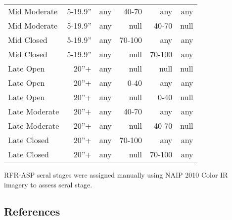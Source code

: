 \begin{table}[hbp]
\begin{tabular}{@{}lrrrrr@{}}
Mid Moderate     & 5-19.9''        & any & 40-70  & any    & any  \\
Mid Moderate     & 5-19.9''        & any & null   & 40-70  & null \\
Mid Closed       & 5-19.9''        & any & 70-100 & any    & any  \\
Mid Closed       & 5-19.9''        & any & null   & 70-100 & any  \\
Late Open        & 20''+           & any & null   & null   & null \\
Late Open        & 20''+           & any & 0-40   & any    & any  \\
Late Open        & 20''+           & any & null   & 0-40   & null \\
Late Moderate    & 20''+           & any & 40-70  & any    & any  \\
Late Moderate    & 20''+           & any & null   & 40-70  & null \\
Late Closed      & 20''+           & any & 70-100 & any    & any  \\
Late Closed      & 20''+           & any & null   & 70-100 & any  \\ \bottomrule
\end{tabular}
\end{table}

RFR-ASP seral stages were assigned manually using NAIP 2010 Color IR imagery to assess seral stage.



\clearpage

\subsection*{References}

